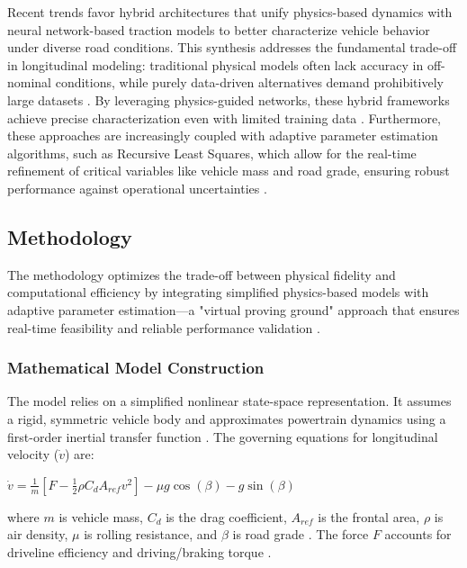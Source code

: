 \documentclass{article}
\begin{document}
Recent trends favor hybrid architectures that unify physics-based dynamics with neural network-based traction models to better characterize vehicle behavior under diverse road conditions. This synthesis addresses the fundamental trade-off in longitudinal modeling: traditional physical models often lack accuracy in off-nominal conditions, while purely data-driven alternatives demand prohibitively large datasets  \parencite{zhisong_zhou_c50a6dda}. By leveraging physics-guided networks, these hybrid frameworks achieve precise characterization even with limited training data  \parencite{zhisong_zhou_c50a6dda}. Furthermore, these approaches are increasingly coupled with adaptive parameter estimation algorithms, such as Recursive Least Squares, which allow for the real-time refinement of critical variables like vehicle mass and road grade, ensuring robust performance against operational uncertainties  \parencite[]{zhisong_zhou_c50a6dda, simon_altmannshofer_f96f1956}.
\subsection{Methodology}

The methodology optimizes the trade-off between physical fidelity and computational efficiency by integrating simplified physics-based models with adaptive parameter estimation—a "virtual proving ground" approach that ensures real-time feasibility and reliable performance validation  \parencite[]{muhammad_abdullah_7f4e5d18, zhisong_zhou_c50a6dda, nour_khoudari_2d5bcaad, sebastian_s__james_30b34609}.
\subsubsection{Mathematical Model Construction}

The model relies on a simplified nonlinear state-space representation. It assumes a rigid, symmetric vehicle body and approximates powertrain dynamics using a first-order inertial transfer function  \parencite{yang_zheng_2fa606c5}. The governing equations for longitudinal velocity ($\dot{v}$) are:

$\dot{v} = \frac{1}{m}[F - \frac{1}{2}\rho C_d A_{ref} v^2] - \mu g \cos(\beta) - g \sin(\beta)$

where $m$ is vehicle mass, $C_d$ is the drag coefficient, $A_{ref}$ is the frontal area, $\rho$ is air density, $\mu$ is rolling resistance, and $\beta$ is road grade  \parencite{aaron_kandel_1d1d52c8}. The force $F$ accounts for driveline efficiency and driving/braking torque  \parencite{yang_zheng_2fa606c5}.
\end{document}
